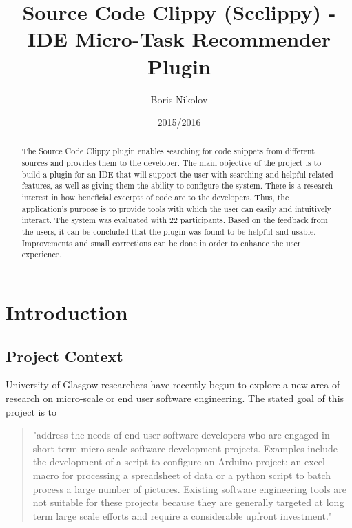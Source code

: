 \documentclass{l4proj}
\begin{document}
\title{Source Code Clippy (Scclippy) - IDE Micro-Task Recommender Plugin}
\author{Boris Nikolov}
\date{2015/2016}
\maketitle

\begin{abstract}
The Source Code Clippy plugin enables searching for code snippets from different sources and provides them to the developer. The main objective of the project is to build a plugin for an IDE that will support the user with searching and helpful related features, as well as giving them the ability to configure the system. There is a research interest in how beneficial excerpts of code are to the developers. Thus, the application's purpose is to provide tools with which the user can easily and intuitively interact. The system was evaluated with 22 participants. Based on the feedback from the users, it can be concluded that the plugin was found to be helpful and usable. Improvements and small corrections can be done in order to enhance the user experience.
\end{abstract}

\educationalconsent
%
%
\tableofcontents

\chapter{Introduction}

\section{Project Context}

University of Glasgow researchers have recently begun to explore a new area of research on micro-scale or end user software engineering. The stated goal of this project is to

\begin{quotation}
\noindent
"address the needs of end user software developers who are engaged in short term micro scale software development projects. Examples include the development of a script to configure an Arduino project; an excel macro for processing a spreadsheet of data or a python script to batch process a large number of pictures. Existing software engineering tools are not suitable for these projects because they are generally targeted at long term large scale efforts and require a considerable upfront investment." \cite{storer2015-scclippy-proposal}
\end{quotation}
\end{document}
